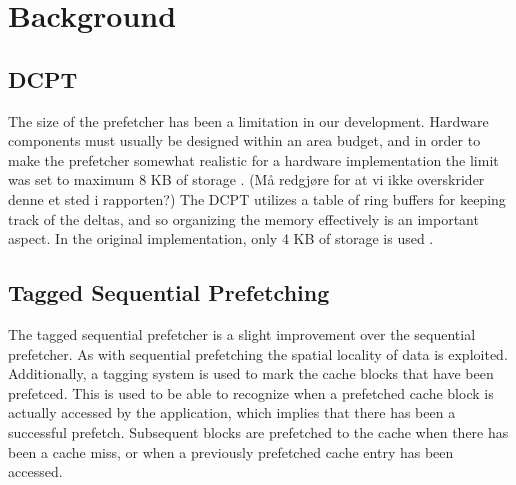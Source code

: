 \section{Background}

\subsection*{DCPT}

The size of the prefetcher has been a limitation in our development. Hardware
components must usually be designed within an area budget, and in order to make
the prefetcher somewhat realistic for a hardware implementation the limit was
set to maximum 8 KB of storage \cite{guidelines}. (Må redgjøre for at vi ikke overskrider denne et
sted i rapporten?) The DCPT utilizes a table of ring buffers for keeping track
of the deltas, and so organizing the memory effectively is an important aspect.
In the original implementation, only 4 KB of storage is used \cite{dcpt}.

\subsection*{Tagged Sequential Prefetching}

The tagged sequential prefetcher is a slight improvement over the sequential
prefetcher. As with sequential prefetching the spatial locality 
of data is exploited. Additionally, a tagging system is used to mark the cache 
blocks that have been prefetced. This is used to be able to recognize when a 
prefetched cache block is actually accessed by the application, which implies 
that there has been a successful prefetch. Subsequent blocks are prefetched 
to the cache when there has been a cache miss, or when a previously prefetched 
cache entry has been accessed.\cite{grannaes}


